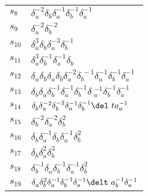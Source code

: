 \documentclass{article}
\begin{document}
\begin{center}
\begin{tabular}{ll}
$s_{8}$ & $\delta_a^{-2}\delta_b^{}\delta_a^{-1}\delta_b^{-1}\delta_a^{-1}$ \\
$s_{9}$ & $\delta_a^{-2}\delta_b^{-2}$ \\
$s_{10}$ & $\delta_a^{3}\delta_b^{}\delta_a^{-3}\delta_b^{-1}$ \\
$s_{11}$ & $\delta_a^{3}\delta_b^{-1}\delta_a^{-1}\delta_b^{}$ \\
$s_{12}$ & $\delta_a^{}\delta_b^{}\delta_a^{}\delta_b^{}\delta_a^{-2}\delta_b^{\
-1}\delta_a^{-1}\delta_b^{-1}\delta_a^{-1}$ \\
$s_{13}$ & $\delta_b^{}\delta_a^{}\delta_b^{-1}\delta_a^{-1}\delta_b^{-1}\delta\
_a^{-1}\delta_b^{-1}\delta_a^{-1}$ \\
$s_{14}$ & $\delta_b^{}\delta_a^{-2}\delta_b^{-2}\delta_a^{-1}\delta_b^{-1}\del\
ta_a^{-1}$ \\
$s_{15}$ & $\delta_b^{-2}\delta_a^{-2}\delta_b^{2}$ \\
$s_{16}$ & $\delta_b^{}\delta_a^{-1}\delta_b^{}\delta_a^{-1}\delta_b^{2}$ \\
$s_{17}$ & $\delta_b^{}\delta_a^{2}\delta_b^{3}$ \\
$s_{18}$ & $\delta_b^{-1}\delta_a^{}\delta_b^{-1}\delta_a^{-1}\delta_b^{2}$ \\
$s_{19}$ & $\delta_a^{}\delta_b^{2}\delta_a^{-1}\delta_b^{-1}\delta_a^{-1}\delt\
a_b^{-1}\delta_a^{-1}$ \\
\bottomrule
\end{tabular}
\end{center}

\thispagestyle{empty}
\end{document}
